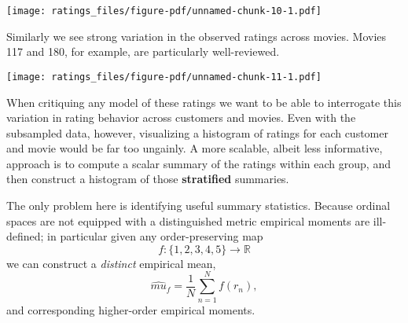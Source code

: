 \documentclass[
  letterpaper,
  DIV=11,
  numbers=noendperiod]{scrartcl}
\newenvironment{Shaded}{\begin{snugshade}}{\end{snugshade}}
\newcommand{\AttributeTok}[1]{\textcolor[rgb]{0.40,0.45,0.13}{#1}}
\newcommand{\ControlFlowTok}[1]{\textcolor[rgb]{0.00,0.23,0.31}{#1}}
\newcommand{\DecValTok}[1]{\textcolor[rgb]{0.68,0.00,0.00}{#1}}
\newcommand{\FloatTok}[1]{\textcolor[rgb]{0.68,0.00,0.00}{#1}}
\newcommand{\FunctionTok}[1]{\textcolor[rgb]{0.28,0.35,0.67}{#1}}
\newcommand{\NormalTok}[1]{\textcolor[rgb]{0.00,0.23,0.31}{#1}}
\newcommand{\SpecialCharTok}[1]{\textcolor[rgb]{0.37,0.37,0.37}{#1}}
\newcommand{\StringTok}[1]{\textcolor[rgb]{0.13,0.47,0.30}{#1}}
\begin{document}
\texttt{[image: ratings\_files/figure-pdf/unnamed-chunk-10-1.pdf]}

Similarly we see strong variation in the observed ratings across movies.
Movies 117 and 180, for example, are particularly well-reviewed.

\begin{Shaded}
\end{Shaded}

\texttt{[image: ratings\_files/figure-pdf/unnamed-chunk-11-1.pdf]}

When critiquing any model of these ratings we want to be able to
interrogate this variation in rating behavior across customers and
movies. Even with the subsampled data, however, visualizing a histogram
of ratings for each customer and movie would be far too ungainly. A more
scalable, albeit less informative, approach is to compute a scalar
summary of the ratings within each group, and then construct a histogram
of those \textbf{stratified} summaries.

The only problem here is identifying useful summary statistics. Because
ordinal spaces are not equipped with a distinguished metric empirical
moments are ill-defined; in particular given any order-preserving map \[
f : \{ 1, 2, 3, 4, 5 \} \rightarrow \mathbb{R}
\] we can construct a \emph{distinct} empirical mean, \[
\hat{mu}_{f} = \frac{1}{N} \sum_{n = 1}^{N} f(r_{n}),
\] and corresponding higher-order empirical moments.
\end{document}
